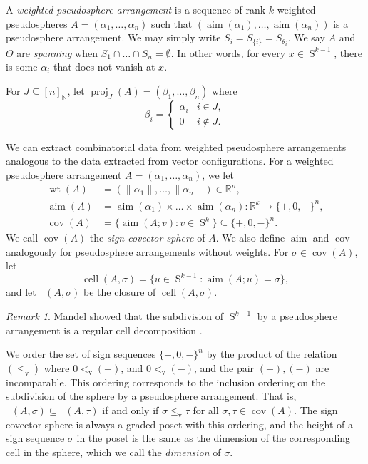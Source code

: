 \documentclass[JEP,XML,SOM,Unicode,NoFloatCountersInSection,published]{cedram}
\theoremstyle{remark}
\newtheorem{remark}[theorem]{Remark}
\let\mb\mathbb
\let\df\emph
\newcommand{\vv}{{\vvv}}
\DeclareMathOperator{\vvv}{v}
\DeclareMathOperator{\wei}{wt}
\DeclareMathOperator{\sphere}{S}
\DeclareMathOperator{\cell}{cell}
\DeclareMathOperator{\Cell}{\overline{cell}}
\DeclareMathOperator{\aim}{aim}
\DeclareMathOperator{\proj}{proj}
\DeclareMathOperator{\cov}{cov}
\begin{document}
A \df{weighted pseudosphere arrangement} is a sequence of rank $k$ weighted pseudospheres ${A} = (\alpha_1,\dots,\alpha_n)$ such that $(\aim(\alpha_1),\dots,\aim(\alpha_n))$ is a pseudosphere arrangement.
We may simply write $S_i = S_{\{i\}} = S_{\theta_i}$.
We say $A$ and $\Theta$ are \df{spanning} when $S_{1} \cap \dots \cap S_{n} = \emptyset$. In other words, for every $x \in \sphere^{k-1}$, there is some $\alpha_i$ that does not vanish at $x$.

For $J \subseteq [n]_\mb{N}$, let $\proj_J(A) = (\beta_1,\dots,\beta_n)$ where
\[\beta_i =
\begin{cases} \alpha_i & i\in J, \\ 0 & i \not\in J .\end{cases} \]

We can extract combinatorial data from weighted pseudosphere arrangements analogous to the data extracted from vector configurations.
For a weighted pseudosphere arrangement $A = (\alpha_1,\dots,\alpha_n)$,
we let
\begin{align*}
\wei(A) &= (\|\alpha_1\|,\dots,\|\alpha_n\|) \in \mb{R}^n, \\
\aim (A) &= \aim(\alpha_1)\times \dots\times \aim(\alpha_n) : \mb{R}^k \to \{+,0,-\}^n, \\
\cov (A) &= \bigl\{ \aim (A; v) :v \in \sphere^{k} \bigr\} \subseteq \{+,0,-\}^n.
\end{align*}
We call $\cov (A)$ the \df{sign covector sphere} of $A$.
We also define $\aim$ and $\cov$ analogously for pseudosphere arrangements without weights.
For $\sigma \in \cov (A)$, let
\[ \cell(A,\sigma) = \bigl\{u \in \sphere^{k-1}:\aim (A; u) = \sigma \bigr\}, \]
and let $\Cell(A,\sigma)$ be the closure of $\cell(A,\sigma)$.

\begin{remark}\label{remark-cell}
Mandel showed that the subdivision of $\sphere^{k-1}$ by a pseudosphere arrangement is a regular cell decomposition \cite{edmonds1978topology}.
\end{remark}

We order the set of sign sequences $\{+,0,-\}^n$ by the product of the relation $(\leq_\vv)$ where ${0 <_\vv ({+})}$, and ${0 <_\vv ({-})}$, and the pair $({+}),({-})$ are incomparable.
This ordering corresponds to the inclusion ordering on the subdivision of the sphere by a pseudosphere arrangement. That is, $\Cell(A,\sigma) \subseteq \Cell(A,\tau)$ if and only if $\sigma \leq_\vv \tau$ for all $\sigma,\tau \in \cov(A)$.
The sign covector sphere is always a graded poset with this ordering,
and the height of a sign sequence $\sigma$ in the poset is the same as the dimension of the corresponding cell in the sphere, which we call the \df{dimension} of $\sigma$.
\end{document}
